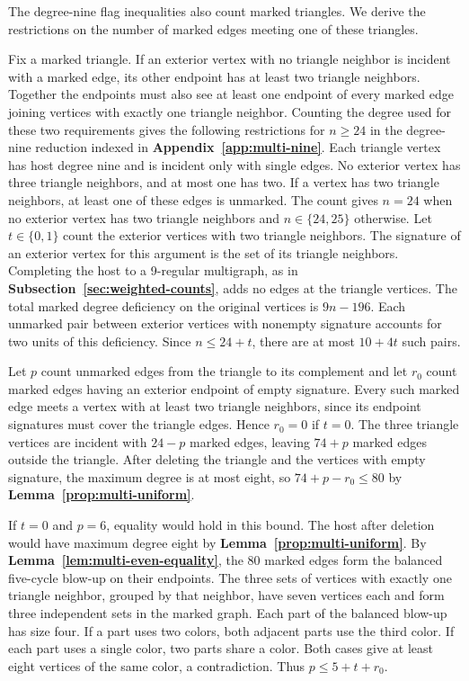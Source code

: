 \documentclass[preprint,11pt,numbers]{elsarticle-arxiv}
\numberwithin{equation}{section}
\theoremstyle{definition}
\begin{document}
The degree-nine flag inequalities also count marked triangles. We
derive the restrictions on the number of marked edges meeting one of
these triangles.

Fix a marked triangle. If an exterior vertex with no triangle
neighbor is incident with a marked edge, its other endpoint has at
least two triangle neighbors. Together the endpoints must also see
at least one endpoint of every marked edge joining vertices with
exactly one triangle neighbor. Counting the degree used for these two
requirements gives the following restrictions for $n\geq24$ in
the degree-nine reduction indexed in
\textbf{Appendix~\ref{app:multi-nine}}. Each triangle vertex has host
degree nine and is incident only with single edges. No exterior
vertex has three triangle neighbors, and at most one has two.
If a vertex has two triangle neighbors, at least one of these edges
is unmarked. The count gives $n=24$ when no exterior vertex has two
triangle neighbors and $n\in\{24,25\}$ otherwise.
Let $t\in\{0,1\}$ count the exterior vertices with two
triangle neighbors. The signature of an exterior vertex
for this argument is the set of its triangle neighbors.
Completing the host to a 9-regular multigraph, as in
\textbf{Subsection~\ref{sec:weighted-counts}}, adds no edges
at the triangle vertices. The total marked degree
deficiency on the original vertices is $9n-196$.
Each unmarked pair between exterior vertices with
nonempty signature accounts for two units of this
deficiency. Since $n\le24+t$, there are at most
$10+4t$ such pairs.

Let $p$ count unmarked edges from the triangle to its
complement and let $r_0$ count marked edges having an
exterior endpoint of empty signature. Every such marked
edge meets a vertex with at least two triangle neighbors,
since its endpoint signatures must cover the triangle
edges. Hence $r_0=0$ if $t=0$. The three triangle vertices
are incident with $24-p$ marked edges, leaving $74+p$
marked edges outside the triangle. After deleting the
triangle and the vertices with empty signature, the
maximum degree is at most eight, so
$74+p-r_0\le80$ by \textbf{Lemma~\ref{prop:multi-uniform}}.

If $t=0$ and $p=6$, equality would hold in this bound.
The host after deletion would have maximum degree eight by
\textbf{Lemma~\ref{prop:multi-uniform}}.
By \textbf{Lemma~\ref{lem:multi-even-equality}}, the 80 marked
edges form the balanced five-cycle blow-up on their endpoints.
The three sets of vertices with
exactly one triangle neighbor, grouped by that
neighbor, have seven vertices each and form three
independent sets in the marked graph. Each part of the
balanced blow-up has size four. If a part uses two
colors, both adjacent parts use the third color. If
each part uses a single color, two parts share a color.
Both cases give at least eight vertices of the same
color, a contradiction. Thus $p\le5+t+r_0$.
\end{document}
